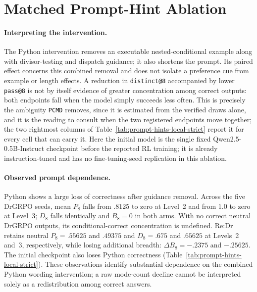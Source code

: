 \documentclass{article}
\newcommand{\1}{\mathbf 1}
\newcommand{\pmd}{\texttt{PCMD}}
\theoremstyle{remark}
\theoremstyle{definition}
\theoremstyle{plain}
\begin{document}
\section{Matched Prompt-Hint Ablation}
\label{app:prompt-hint-ablation}



\paragraph{Interpreting the intervention.}
The Python intervention removes an executable nested-conditional example
along with divisor-testing and dispatch guidance; it also shortens the prompt.
Its paired effect concerns this combined removal and does not isolate a
preference cue from example or length effects. A reduction in
\texttt{distinct@8} accompanied by lower \texttt{pass@8} is not by itself
evidence of greater concentration among correct outputs: both endpoints fall
when the model simply succeeds less often. This is precisely the ambiguity
\pmd{} removes, since it is estimated from the verified draws alone, and it is
the reading to consult when the two registered endpoints move together; the two
rightmost columns of Table~\ref{tab:prompt-hints-local-strict} report it for
every cell that can carry it.
Here the initial model is the single fixed Qwen2.5-0.5B-Instruct checkpoint
before the reported RL training; it is already instruction-tuned and has no
fine-tuning-seed replication in this ablation.


\paragraph{Observed prompt dependence.}
Python shows a large loss of correctness after guidance removal. Across the
five DrGRPO seeds, mean $P_8$ falls from $.8125$ to zero at Level~2 and from
$1.0$ to zero at Level~3; $D_8$ falls identically and $B_8=0$ in both arms.
With no correct neutral DrGRPO outputs, its conditional-correct concentration
is undefined. Re:Dr retains neutral $P_8=.55625$ and $.49375$ and
$D_8=.675$ and $.65625$ at Levels~2 and~3, respectively, while losing
additional breadth: $\Delta B_8=-.2375$ and $-.25625$. The initial checkpoint
also loses Python correctness (Table~\ref{tab:prompt-hints-local-strict}).
These observations identify substantial dependence on the combined Python
wording intervention; a raw mode-count decline cannot be interpreted solely
as a redistribution among correct answers.
\end{document}
